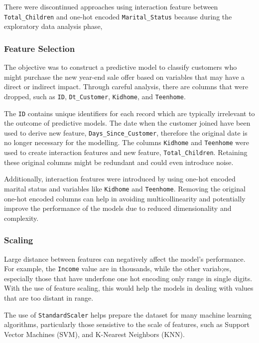 There were discontinued approaches using interaction feature between \texttt{Total\_Children} and one-hot encoded \texttt{Marital\_Status} because during the exploratory data analysis phase,

\subsubsection{Feature Selection}

The objective was to construct a predictive model to classify customers who might purchase the new year-end sale offer based on variables that may have a direct or indirect impact. Through careful analysis, there are columns that were dropped, such as \texttt{ID}, \texttt{Dt\_Customer}, \texttt{Kidhome}, and \texttt{Teenhome}. 

The \texttt{ID} contains unique identifiers for each record which are typically irrelevant to the outcome of predictive models. The date when the customer joined have been used to derive new feature, \texttt{Days\_Since\_Customer}, therefore the original date is no longer necessary for the modelling. The columns \texttt{Kidhome} and \texttt{Teenhome} were used to create interaction features and new feature, \texttt{Total\_Children}. Retaining these original columns might be redundant and could even introduce noise.

Additionally, interaction features were introduced by  using one-hot encoded marital status and variables like \texttt{Kidhome} and \texttt{Teenhome}. Removing the original one-hot encoded columns can help in avoiding multicollinearity and potentially improve the performance of the models due to reduced dimensionality and complexity.

\subsubsection{Scaling}

Large distance between features can negatively affect the model's performance. For example, the \texttt{Income} value are in thousands, while the other variab;es, especially those that have underfone one hot encoding only range in single digits. With the use of feature scaling, this would help the models in dealing with values that are too distant in range.

The use of \texttt{StandardScaler} helps prepare the dataset for many machine learning algorithms, particularly those sensistive to the scale of features, such as Support Vector Machines (SVM), and K-Nearest Neighbors (KNN). 


